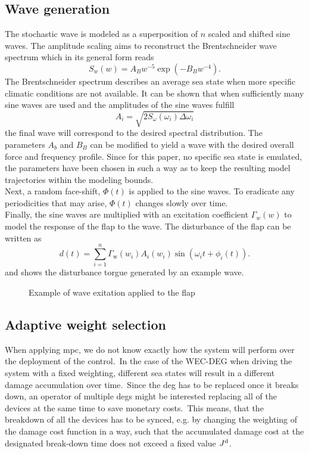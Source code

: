 \subsection{Wave generation}
The stochastic wave is modeled as a superposition of $n$ scaled and shifted sine waves. The amplitude scaling aims to reconstruct the Brentschneider wave spectrum which in its general form reads
\begin{equation}
S_w(w)=A_B w^{-5} \exp \left(-B_B w^{-4}\right).
\end{equation}
The Brentschneider spectrum describes an average sea state when more specific climatic conditions are not available. 
It can be shown that when sufficiently many sine waves are used and the amplitudes of the sine waves fulfill
\begin{equation}
A_i=\sqrt{2 S_\omega\left(\omega_i\right) \Delta \omega_i}
\end{equation}
the final wave will correspond to the desired spectral distribution.
The parameters $A_b$ and $B_B$ can be modified to yield a wave with the desired overall force and frequency profile. Since for this paper, no specific sea state is emulated, the parameters have been chosen in such a way as to keep the resulting model trajectories within the modeling bounds.\\
Next, a random face-shift, $\Phi(t)$ is applied to the sine waves. 
To eradicate any periodicities that may arise, $\Phi(t)$ changes slowly over time. 
\\
Finally, the sine waves are multiplied with an excitation coefficient $\Gamma_w(w)$ to model the response of the flap to the wave. 
The disturbance of the flap can be written as 
\begin{equation}
    d(t)=\sum_{i = 1}^{n} \Gamma_{\mathrm{w}}(w_i) A_i(w_i) \sin \left(\omega_i t+\phi_i(t)\right).
\end{equation}
and  shows the disturbance torgue generated by an example wave.
\begin{figure}[htb]
	\centering
	\fontsize{8}{0}\selectfont
	\def\svgwidth{0.49\textwidth}
	
	\caption{Example of wave exitation applied to the flap}
	\label{fig:ExampleWave}
\end{figure}

\subsection{Adaptive weight selection}
When applying \ac{mpc}, we do not know exactly how the system will perform over the deployment of the control.\ 
In the case of the WEC-DEG when driving the system with a fixed weighting, different sea states will result in a different damage accumulation over time.\ 
Since the \ac{deg} has to be replaced once it breaks down, an operator of multiple \acp{deg} might be interested replacing all of the devices at the same time to save monetary costs.\ 
This means, that the breakdown of all the devices has to be synced, e.g. by changing the weighting of the damage cost function in a way, such that the accumulated damage cost at the designated break-down time \tbd does not exceed a fixed value $J^\mathrm{d}$.\ 

